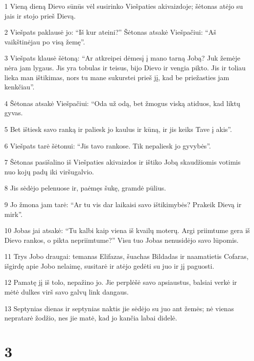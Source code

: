 \par 1 Vieną dieną Dievo sūnūs vėl susirinko Viešpaties akivaizdoje; šėtonas atėjo su jais ir stojo prieš Dievą. 
\par 2 Viešpats paklausė jo: “Iš kur ateini?” Šėtonas atsakė Viešpačiui: “Aš vaikštinėjau po visą žemę”. 
\par 3 Viešpats klausė šėtoną: “Ar atkreipei dėmesį į mano tarną Jobą? Juk žemėje nėra jam lygaus. Jis yra tobulas ir teisus, bijo Dievo ir vengia pikto. Jis ir toliau lieka man ištikimas, nors tu mane sukurstei prieš jį, kad be priežasties jam kenkčiau”. 
\par 4 Šėtonas atsakė Viešpačiui: “Oda už odą, bet žmogus viską atiduos, kad liktų gyvas. 
\par 5 Bet ištiesk savo ranką ir paliesk jo kaulus ir kūną, ir jis keiks Tave į akis”. 
\par 6 Viešpats tarė šėtonui: “Jis tavo rankose. Tik nepaliesk jo gyvybės”. 
\par 7 Šėtonas pasišalino iš Viešpaties akivaizdos ir ištiko Jobą skaudžiomis votimis nuo kojų padų iki viršugalvio. 
\par 8 Jis sėdėjo pelenuose ir, paėmęs šukę, gramdė pūlius. 
\par 9 Jo žmona jam tarė: “Ar tu vis dar laikaisi savo ištikimybės? Prakeik Dievą ir mirk”. 
\par 10 Jobas jai atsakė: “Tu kalbi kaip viena iš kvailų moterų. Argi priimtume gera iš Dievo rankos, o pikta nepriimtume?” Visu tuo Jobas nenusidėjo savo lūpomis. 
\par 11 Trys Jobo draugai: temanas Elifazas, šuachas Bildadas ir naamatietis Cofaras, išgirdę apie Jobo nelaimę, susitarė ir atėjo gedėti su juo ir jį paguosti. 
\par 12 Pamatę jį iš tolo, nepažino jo. Jie perplėšė savo apsiaustus, balsiai verkė ir mėtė dulkes virš savo galvų link dangaus. 
\par 13 Septynias dienas ir septynias naktis jie sėdėjo su juo ant žemės; nė vienas nepratarė žodžio, nes jie matė, kad jo kančia labai didelė.



\chapter{3}


